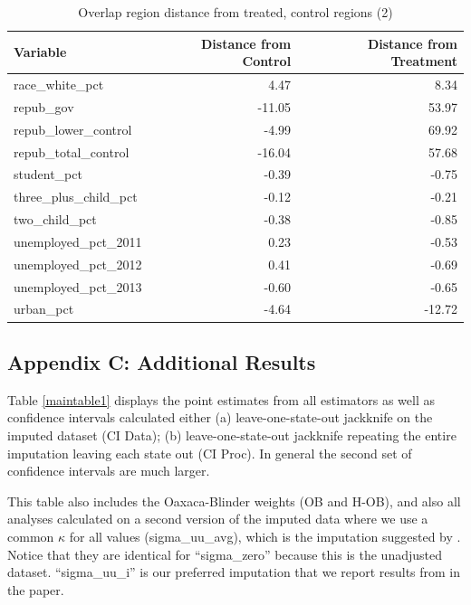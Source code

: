 \documentclass[12pt]{article}
\begin{document}
\begin{table}[ht]
\centering
\begin{tabular}{lrr}
  \hline
Variable & Distance from Control & Distance from Treatment \\ 
  \hline
  race\_white\_pct & 4.47 & 8.34 \\ 
  repub\_gov & -11.05 & 53.97 \\ 
  repub\_lower\_control & -4.99 & 69.92 \\ 
  repub\_total\_control & -16.04 & 57.68 \\ 
  student\_pct & -0.39 & -0.75 \\ 
  three\_plus\_child\_pct & -0.12 & -0.21 \\ 
  two\_child\_pct & -0.38 & -0.85 \\ 
  unemployed\_pct\_2011 & 0.23 & -0.53 \\ 
  unemployed\_pct\_2012 & 0.41 & -0.69 \\ 
  unemployed\_pct\_2013 & -0.60 & -0.65 \\ 
  urban\_pct & -4.64 & -12.72 \\ 
   \hline
\end{tabular}
\caption{Overlap region distance from treated, control regions (2)}
\label{oatedist2}
\end{table}

\subsection{Appendix C: Additional Results}

Table \ref{maintable1} displays the point estimates from all estimators as well as confidence intervals calculated either (a) leave-one-state-out jackknife on the imputed dataset (CI Data); (b) leave-one-state-out jackknife repeating the entire imputation leaving each state out (CI Proc). In general the second set of confidence intervals are much larger. 

This table also includes the Oaxaca-Blinder weights (OB and H-OB), and also all analyses calculated on a second version of the imputed data where we use a common $\kappa$ for all values (sigma\_uu\_avg), which is the imputation suggested by \cite{carroll2006measurement}. Notice that they are identical for ``sigma\_zero'' because this is the unadjusted dataset. ``sigma\_uu\_i'' is our preferred imputation that we report results from in the paper.
\end{document}
